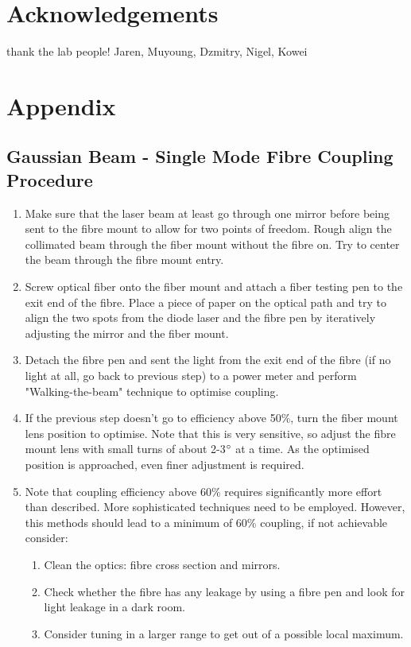 \documentclass[12pt]{report}
\begin{document}
\section{Acknowledgements}
thank the lab people! Jaren, Muyoung, Dzmitry, Nigel, Kowei

\section{Appendix}
\subsection{Gaussian Beam - Single Mode Fibre Coupling Procedure} \label{appendix:laerFibreCoupling}
\begin{enumerate}
    \item Make sure that the laser beam at least go through one mirror before being sent to the fibre mount to allow for two points of freedom. Rough align the collimated beam through the fiber mount without the fibre on. Try to center the beam through the fibre mount entry. 
    \item Screw optical fiber onto the fiber mount and attach a fiber testing pen to the exit end of the fibre. Place a piece of paper on the optical path and try to align the two spots from the diode laser and the fibre pen by iteratively adjusting the mirror and the fiber mount. 
    \item Detach the fibre pen and sent the light from the exit end of the fibre (if no light at all, go back to previous step) to a power meter and perform "Walking-the-beam" technique \cite{WalkingTheBeamThorlabs} to optimise coupling. 
    \item If the previous step doesn't go to efficiency above 50\%, turn the fiber mount lens position to optimise. Note that this is very sensitive, so adjust the fibre mount lens with small turns of about 2-3$\degree$ at a time. As the optimised position is approached, even finer adjustment is required. 
    \item Note that coupling efficiency above 60\% requires significantly more effort than described. More sophisticated techniques need to be employed. However, this methods should lead to a minimum of 60\% coupling, if not achievable consider: 
    \begin{enumerate}
        \item Clean the optics: fibre cross section and mirrors.
        \item Check whether the fibre has any leakage by using a fibre pen and look for light leakage in a dark room. 
        \item Consider tuning in a larger range to get out of a possible local maximum. 
    \end{enumerate}
\end{enumerate}
\end{document}
